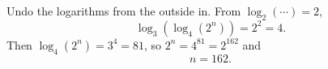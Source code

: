 Undo the logarithms from the outside in. From $\log_2(\cdots)=2$,
\[
\log_3\left(\log_4\left(2^n\right)\right)=2^2=4 .
\]
Then $\log_4\left(2^n\right)=3^4=81$, so $2^n=4^{81}=2^{162}$ and
\[
n=\boxed{162}.
\]

